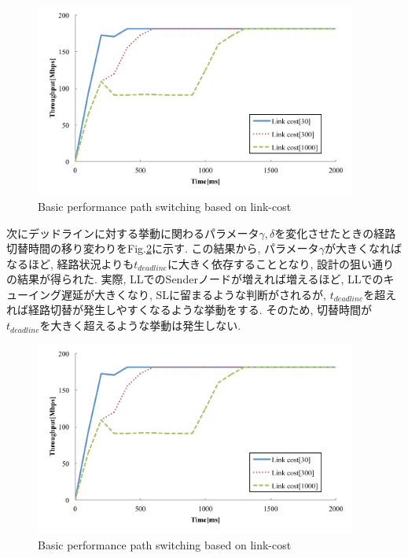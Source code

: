 \begin{figure}[t]
    \begin{center}
    \includegraphics[autoebb, width=300pt]{./img/basic_cost.pdf}
    \caption{Basic performance path switching based on
    link-cost}
    \label{fig:basic_para_link}
    \end{center}
\end{figure}


次にデッドラインに対する挙動に関わるパラメータ$\gamma,
\delta$を変化させたときの経路切替時間の移り変わりをFig.\ref{fig:basic_para_dead}に示す.
この結果から, パラメータ$\gamma$が大きくなればなるほど, 経路状況よりも$t_{deadline}$に大きく依存することとなり,
設計の狙い通りの結果が得られた.
実際, LLでのSenderノードが増えれば増えるほど, LLでのキューイング遅延が大きくなり, SLに留まるような判断がされるが,
$t_{deadline}$を超えれば経路切替が発生しやすくなるような挙動をする.
そのため, 切替時間が$t_{deadline}$を大きく超えるような挙動は発生しない. 

\begin{figure}[t]
    \begin{center}
    \includegraphics[autoebb, width=300pt]{./img/basic_cost.pdf}
    \caption{Basic performance path switching based on
    link-cost}
    \label{fig:basic_para_dead}
    \end{center}
\end{figure}

